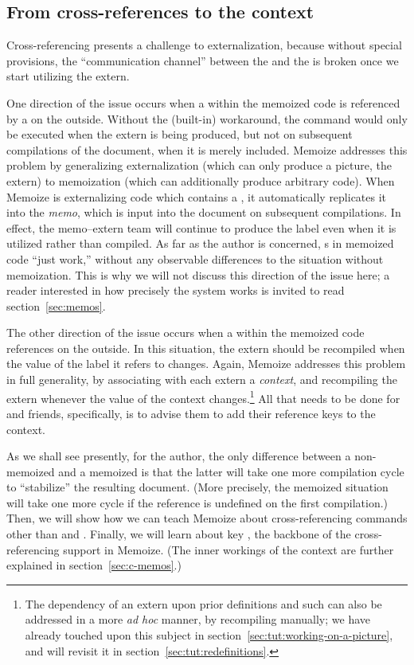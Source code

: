\documentclass[a4paper,11pt]{article}
\begin{document}
\subsection{From cross-references to the context}
\label{sec:cross-referencing}

Cross-referencing presents a challenge to externalization, because without
special provisions, the ``communication channel'' between the  and the
 is broken once we start utilizing the extern.

One direction of the issue occurs when a  within the memoized
code is referenced by a  on the outside.  Without the (built-in)
workaround, the  command would only be executed when the extern is
being produced, but not on subsequent compilations of the document, when it is
merely included.  Memoize addresses this problem by generalizing
externalization (which can only produce a picture, the extern) to memoization
(which can additionally produce arbitrary code).  When Memoize is externalizing
code which contains a , it automatically replicates it into the
\emph{memo}, which is input into the document on subsequent compilations. In
effect, the memo--extern team will continue to produce the label even when it
is utilized rather than compiled.  As far as the author is concerned, s
in memoized code ``just work,'' without any observable differences to the
situation without memoization.  This is why we will not discuss this direction
of the issue here; a reader interested in how precisely the system works is
invited to read section~\ref{sec:memos}.

The other direction of the issue occurs when a  within the memoized
code references  on the outside.  In this situation, the extern
should be recompiled when the value of the label it refers to changes.  Again,
Memoize addresses this problem in full generality, by associating with each
extern a \emph{context}, and recompiling the extern whenever the value of the
context changes.\footnote{The dependency of an extern upon prior definitions
  and such can also be addressed in a more \emph{ad hoc} manner, by recompiling
  manually; we have already touched upon this subject in
  section~\ref{sec:tut:working-on-a-picture}, and will revisit it in
  section~\ref{sec:tut:redefinitions}.}  All that needs to be done for 
and friends, specifically, is to advise them to add their reference keys to the
context.

As we shall see presently, for the author, the only difference between a
non-memoized and a memoized  is that the latter will take one more
compilation cycle to ``stabilize'' the resulting document.  (More precisely,
the memoized situation will take one more cycle if the reference is undefined
on the first compilation.)  Then, we will show how we can teach Memoize about
cross-referencing commands other than  and .  Finally, we will
learn about key , the backbone of the cross-referencing support
in Memoize.  (The inner workings of the context are further explained in
section~\ref{sec:c-memos}.)
\end{document}
